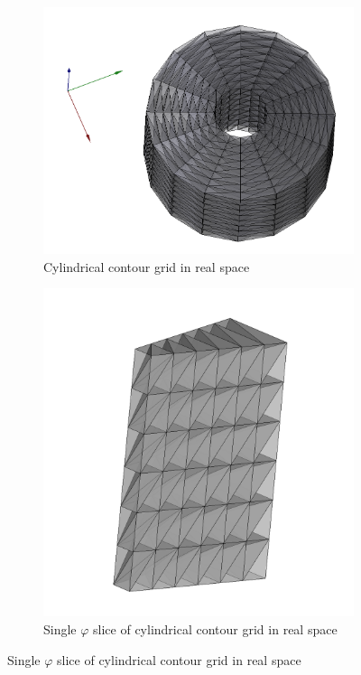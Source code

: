 \documentclass[./main.tex]{subfiles}
\begin{document}
\begin{figure}[h]
	\begin{subfigure}[b]{0.45\textwidth}
		\includegraphics[width=\textwidth]{figures/full_grid_rect.png}
		\caption{Cylindrical contour grid in real space}
		\label{fig:full_grid_rect}
	\end{subfigure}
	\hfill
	\begin{subfigure}[b]{0.45\textwidth}
		\includegraphics[width=\textwidth]{figures/slice_grid_rect.png}
		\caption{Single $\varphi$ slice of cylindrical contour grid in real space}
		\label{fig:slice_grid_rect}
	\end{subfigure}\hfill
\end{figure}
\end{document}
